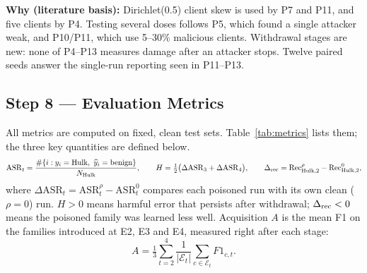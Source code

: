 \documentclass[10pt,a4paper]{article}
\newcommand{\why}[1]{\par\noindent\colorbox{black!5}{\parbox{\dimexpr\linewidth-2\fboxsep}{\small\textbf{Why (literature basis):} #1}}\par}
\begin{document}
\why{Dirichlet(0.5) client skew is used by P7 and P11, and five clients by P4. Testing several doses follows P5, which found a single attacker weak, and P10/P11, which use 5--30\% malicious clients. Withdrawal stages are new: none of P4--P13 measures damage after an attacker stops. Twelve paired seeds answer the single-run reporting seen in P11--P13.}

\subsection{Step 8 --- Evaluation Metrics}
All metrics are computed on fixed, clean test sets. Table~\ref{tab:metrics} lists them; the three key quantities are defined below.
\begin{equation}
\mathrm{ASR}_t=\frac{\#\{i:y_i=\text{Hulk},\ \widehat y_i=\text{benign}\}}{N_{\rm Hulk}},\qquad
H=\tfrac12\big(\Delta\mathrm{ASR}_3+\Delta\mathrm{ASR}_4\big),\qquad
\Delta_{\rm rec}=\mathrm{Rec}^{\rho}_{{\rm Hulk},2}-\mathrm{Rec}^{0}_{{\rm Hulk},2},
\label{eq:asr}
\end{equation}
where $\Delta\mathrm{ASR}_t=\mathrm{ASR}^{\rho}_t-\mathrm{ASR}^{0}_t$ compares each poisoned run with its own clean ($\rho=0$) run. $H>0$ means harmful error that persists after withdrawal; $\Delta_{\rm rec}<0$ means the poisoned family was learned less well. Acquisition $A$ is the mean F1 on the families introduced at E2, E3 and E4, measured right after each stage:
\begin{equation}
A=\tfrac13\sum_{t=2}^{4}\frac{1}{|\mathcal E_t|}\sum_{c\in\mathcal E_t}F1_{c,t}.
\label{eq:acquisition}
\end{equation}
\end{document}
